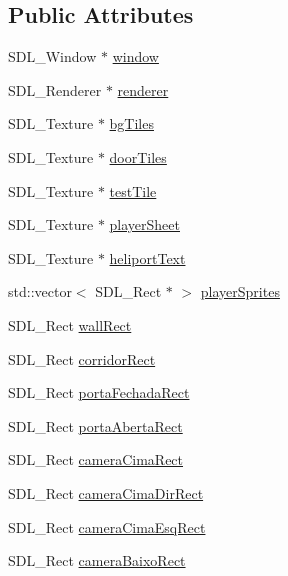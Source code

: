 \subsection*{Public Attributes}
\begin{DoxyCompactItemize}
\item 
S\+D\+L\+\_\+\+Window $\ast$ \hyperlink{classViewer_a9f4bbe40df531d56d30098af395bfd42}{window}
\item 
S\+D\+L\+\_\+\+Renderer $\ast$ \hyperlink{classViewer_aa242869e70efed8cbd51e0345db286d5}{renderer}
\item 
S\+D\+L\+\_\+\+Texture $\ast$ \hyperlink{classViewer_a05710c1f079a9099419fd1882643a349}{bg\+Tiles}
\item 
S\+D\+L\+\_\+\+Texture $\ast$ \hyperlink{classViewer_a9c91a1e8d706ae06579922ba31088775}{door\+Tiles}
\item 
S\+D\+L\+\_\+\+Texture $\ast$ \hyperlink{classViewer_a68100cc46ca81331b8eb394de47ead87}{test\+Tile}
\item 
S\+D\+L\+\_\+\+Texture $\ast$ \hyperlink{classViewer_a9bb70fa5cb5dd60d328cee1f6b23c7de}{player\+Sheet}
\item 
S\+D\+L\+\_\+\+Texture $\ast$ \hyperlink{classViewer_a6885109c94a29d43259967707ab3910e}{heliport\+Text}
\item 
std\+::vector$<$ S\+D\+L\+\_\+\+Rect $\ast$ $>$ \hyperlink{classViewer_a29c1477b7847d678e5927ccfa5950969}{player\+Sprites}
\item 
S\+D\+L\+\_\+\+Rect \hyperlink{classViewer_a5475b38369314f06da131e7ca558dec0}{wall\+Rect}
\item 
S\+D\+L\+\_\+\+Rect \hyperlink{classViewer_abc5bc66b70995658bc7485a83a66555d}{corridor\+Rect}
\item 
S\+D\+L\+\_\+\+Rect \hyperlink{classViewer_a43249e2007827e3cd55529efd37c528d}{porta\+Fechada\+Rect}
\item 
S\+D\+L\+\_\+\+Rect \hyperlink{classViewer_a6c875f769828a91e54df3c5c379e74a1}{porta\+Aberta\+Rect}
\item 
S\+D\+L\+\_\+\+Rect \hyperlink{classViewer_a2564f386e8d491f4a3a52cd21037b0ab}{camera\+Cima\+Rect}
\item 
S\+D\+L\+\_\+\+Rect \hyperlink{classViewer_a8cd66938fa5418497e5f8bb877960409}{camera\+Cima\+Dir\+Rect}
\item 
S\+D\+L\+\_\+\+Rect \hyperlink{classViewer_af8303b86bd4da1c5d93042b9c9a091f5}{camera\+Cima\+Esq\+Rect}
\item 
S\+D\+L\+\_\+\+Rect \hyperlink{classViewer_a95a1339fd00bd739da9e6c2bd05e95ec}{camera\+Baixo\+Rect}

\end{DoxyCompactItemize}
